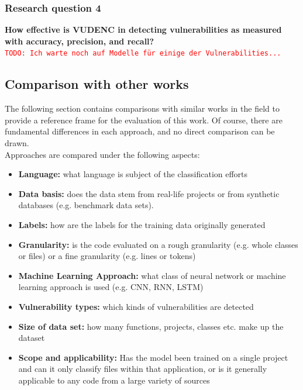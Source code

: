 \documentclass[
a4paper,
pagesize,
pdftex,
12pt,
twoside, %
BCOR=5mm, %
ngerman,
fleqn,
final,
]{scrartcl}
\begin{document}
	\subsubsection{Research question 4}
	\textbf{How effective is VUDENC in detecting vulnerabilities as measured with accuracy, precision, and recall? }\\
	\textcolor{red}{\texttt{TODO: Ich warte noch auf Modelle für einige der Vulnerabilities...}}
	
	\subsection{Comparison with other works}
	
	The following section contains comparisons with similar works in the field to provide a reference frame for the evaluation of this work. Of course, there are fundamental differences in each approach, and no direct comparison can be drawn.\\
	Approaches are compared under the following aspects:\\
	\begin{itemize}
		\item \textbf{Language:} what language is subject of the classification efforts
		\item \textbf{Data basis:} does the data stem from real-life projects or from synthetic databases (e.g. benchmark data sets).
		\item \textbf{Labels:} how are the labels for the training data originally generated
		\item \textbf{Granularity:} is the code evaluated on a rough granularity (e.g. whole classes or files) or a fine granularity (e.g. lines or tokens)
		\item \textbf{Machine Learning Approach:} what class of neural network or machine learning approach is used (e.g. CNN, RNN, LSTM)
		\item \textbf{Vulnerability types:} which kinds of vulnerabilities are detected
		\item \textbf{Size of data set:} how many functions, projects, classes etc. make up the dataset
		\item \textbf{Scope and applicability:} Has the model been trained on a single project and can it only classify files within that application, or is it generally applicable to any code from a large variety of sources
	\end{itemize}
	
\end{document}
